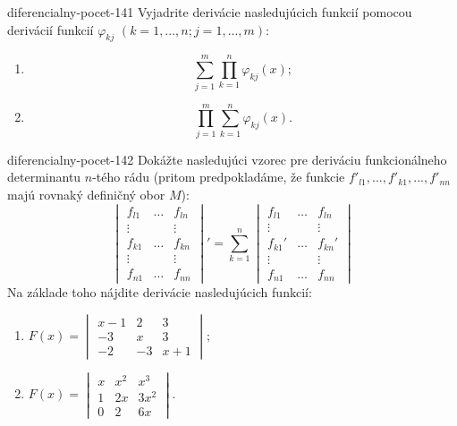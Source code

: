 \begin{defproblem}{diferencialny-pocet-141}
Vyjadrite derivácie nasledujúcich funkcií pomocou derivácií funkcií $\varphi_{kj}$ $(k=1,...,n; j=1,...,m)$:
\begin{multicols}{2}
\begin{enumerate}
    \item $$\sum_{j=1}^{m}\prod_{k=1}^n \varphi_{kj}(x);$$
	\item $$\prod_{j=1}^{m}\sum_{k=1}^n \varphi_{kj}(x).$$
\end{enumerate}
\end{multicols}
\end{defproblem}

\begin{defproblem}{diferencialny-pocet-142}
Dokážte nasledujúci vzorec pre deriváciu funkcionálneho determinantu $n$-tého rádu (pritom predpokladáme, že funkcie $f'_{l1},...,f'_{k1},...,f'_{nn}$ majú rovnaký definičný obor $M$):
$$\begin{vmatrix}
f_{l1} & \dots & f_{ln} \\
\vdots & & \vdots\\
f_{k1} & \dots & f_{kn} \\
\vdots & & \vdots\\
f_{n1} & \dots & f_{nn}
\end{vmatrix}'
= \sum_{k=1}^n
\begin{vmatrix}
f_{l1} & \dots & f_{ln} \\
\vdots & & \vdots\\
f_{k1}' & \dots & f_{kn}' \\
\vdots & & \vdots\\
f_{n1} & \dots & f_{nn}
\end{vmatrix}$$
Na základe toho nájdite derivácie nasledujúcich funkcií:
\begin{multicols}{2}
\begin{enumerate}
\item $F(x)=
\begin{vmatrix}
x-1 & 2 & 3 \\
-3 & x & 3 \\
-2 & -3 & x+1
\end{vmatrix};$
\item $F(x)=
\begin{vmatrix}
x & x^2 & x^3 \\
1 & 2x & 3x^2 \\
0 & 2 & 6x
\end{vmatrix}.$
\end{enumerate}
\end{multicols}
\end{defproblem}

